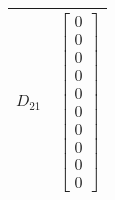 \begin{tabular}{cl}
 $D_{21}$ & $\left[\begin{matrix}0\\0\\0\\0\\0\\0\\0\\0\\0\\0\end{matrix}\right]$                                                                                                                                                                                                                                                                                                                                                                                                                                                                                                                                                                                                                                                                                                                                                                                                                                                                                                                                                                                                                                                                                                                                                                                                                                                                                                                                                                                                                                                                                                                                                                                                                                                                                                                                                                           \\
\hline
\end{tabular}